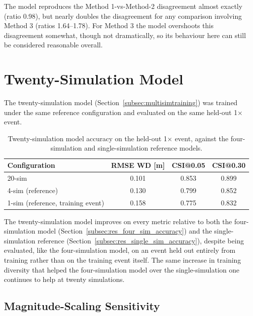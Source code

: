 \documentclass[12pt,a4paper]{report}
\begin{document}
{The model reproduces the Method 1-vs-Method-2 disagreement almost exactly (ratio
0.98), but nearly doubles the disagreement for any comparison involving Method 3
(ratios 1.64--1.78).
For Method 3 the model overshoots this disagreement somewhat, though not
dramatically, so its behaviour here can still be considered reasonable overall.
 
 
\section{Twenty-Simulation Model}
\label{sec:res_twenty_sim}
 
The twenty-simulation model (Section~\ref{subsec:multisimtraining}) was trained under
the same reference configuration and evaluated on the same held-out 1$\times$ event.
 
\begin{table}[H]
  \centering
  \caption{Twenty-simulation model accuracy on the held-out 1$\times$ event, against the four-simulation and single-simulation reference models.}
  \label{tab:twentysim-accuracy}
  \begin{tabular}{lccc}
    \toprule
    Configuration & RMSE WD [m] & CSI@0.05 & CSI@0.30 \\
    \midrule
    20-sim                     & 0.101 & 0.853 & 0.899 \\
    4-sim (reference)          & 0.130 & 0.799 & 0.852 \\
    1-sim (reference, training event) & 0.158 & 0.775 & 0.832 \\
    \bottomrule
  \end{tabular}
\end{table}
 
The twenty-simulation model improves on every metric relative to both the
four-simulation model (Section~\ref{subsec:res_four_sim_accuracy}) and the
single-simulation reference (Section~\ref{subsec:res_single_sim_accuracy}), despite
being evaluated, like the four-simulation model, on an event held out entirely from
training rather than on the training event itself. The same increase in training diversity that helped the
four-simulation model over the single-simulation one continues to help at twenty
simulations.
 
\subsection{Magnitude-Scaling Sensitivity}
\label{subsec:res_twenty_sim_magnitude_sensitivity}
 
}
\end{document}
